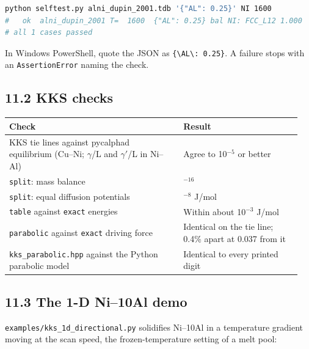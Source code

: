 \documentclass[12pt,a4paper]{article}
\begin{document}
\begin{lstlisting}[basicstyle={\footnotesize\ttfamily},language=bash]
python selftest.py alni_dupin_2001.tdb '{"AL": 0.25}' NI 1600
#   ok  alni_dupin_2001 T=  1600  {"AL": 0.25} bal NI: FCC_L12 1.000
# all 1 cases passed
\end{lstlisting}
In Windows PowerShell, quote the JSON as \texttt{\textquotesingle{}\{\textbackslash{}\textquotedbl{}AL\textbackslash{}\textquotedbl{}: 0.\allowbreak{}25\}\textquotesingle{}}. A failure stops with an \texttt{AssertionError} naming the check.


\subsection*{11.2 KKS checks}
\begingroup\small
\begin{longtable}{>{\raggedright\arraybackslash}p{0.561\linewidth}>{\raggedright\arraybackslash}p{0.386\linewidth}}
\toprule
\textbf{Check} & \textbf{Result} \\
\midrule
\endhead
KKS tie lines against pycalphad equilibrium (Cu--Ni; \(\gamma\)/L and \(\gamma '\)/L in Ni--Al) & Agree to 10\(^{-5}\) or better \\
\texttt{split}: mass balance & 10\(^{-16}\) \\
\texttt{split}: equal diffusion potentials & 10\(^{-8}\) J/mol \\
\texttt{table} against \texttt{exact} energies & Within about 10\(^{-3}\) J/mol \\
\texttt{parabolic} against \texttt{exact} driving force & Identical on the tie line; 0.4\% apart at 0.037 from it \\
\texttt{kks\_\allowbreak{}parabolic.\allowbreak{}hpp} against the Python parabolic model & Identical to every printed digit \\
\bottomrule
\end{longtable}
\endgroup

\subsection*{11.3 The 1-D Ni--10Al demo}
\texttt{examples/\allowbreak{}kks\_\allowbreak{}1d\_\allowbreak{}directional.\allowbreak{}py} solidifies Ni--10Al in a temperature gradient moving at the scan speed, the frozen-temperature setting of a melt pool:
\end{document}
